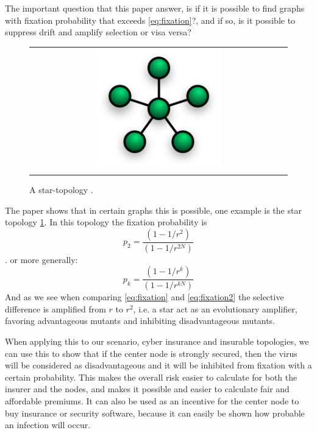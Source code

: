 The important question that this paper answer, is if it is possible to find graphs with fixation probability that exceeds \ref{eq:fixation}?, and if so, is it possible to suppress drift and amplify selection or visa versa?
\begin{figure}
\centering
\begin{tabular}{@{}c@{}}
\includegraphics[width=0.5\textwidth]{NetworkTopology-Star.png}
\end{tabular}
\caption{\label{fig:star} A star-topology \cite{lieberman2005evolutionary}. }
\end{figure}

The paper shows that in certain graphs this is possible, one example is the star topology \ref{fig:star}.
In this topology the fixation probability is\begin{equation}p_{2}=\frac{(1-1/r^{2})}{(1-1/r^{2N})} \label{eq:fixation2} \end{equation}.
or more generally: \begin{equation}
p_{k}=\frac{(1-1/r^{k})}{(1-1/r^{kN})} \label{eq:fixationk}
\end{equation}
And as we see when comparing \ref{eq:fixation} and \ref{eq:fixation2} the selective difference is
 amplified from $r$ to $r^{2}$, i.e. a star act as an evolutionary amplifier, favoring advantageous
  mutants and inhibiting disadvantageous mutants.
  
When applying this to our scenario, cyber insurance and insurable topologies, we can use this to show
 that if the center node is strongly secured, then the virus will be considered as disadvantageous and
it will be inhibited from fixation with a certain probability. 
This makes the overall risk easier to calculate for both the insurer and the nodes,
and makes it possible and easier to calculate fair and affordable premiums. 
It can also be used as an incentive for the center node to buy insurance or security software, 
because it can easily be shown how probable an infection will occur. 

